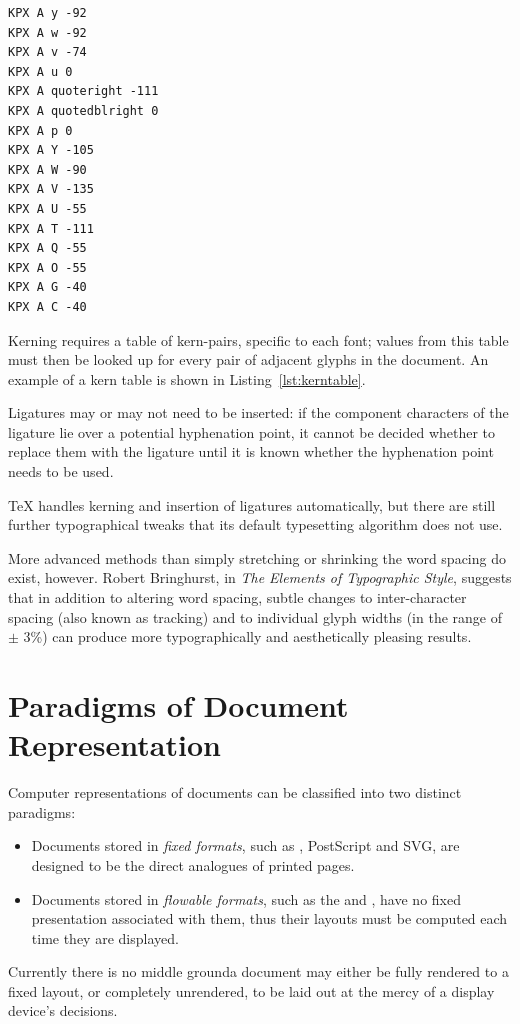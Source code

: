 \begin{lstlisting}[label=lst:kerntable,captionpos=b,float,basicstyle=\ttfamily\footnotesize,caption={[Excerpt from a kern table]An excerpt from a kern table for Times Roman, showing kern pairs beginning with \texttt{A} only. This is taken from an AFM (Adobe Font Metrics) file, where the units are (according to the specification\cite{ASI1998}) ``\emph{equal to 1/1000 of the scale factor (point size) of the font being used}''.}]
KPX A y -92
KPX A w -92
KPX A v -74
KPX A u 0
KPX A quoteright -111
KPX A quotedblright 0
KPX A p 0
KPX A Y -105
KPX A W -90
KPX A V -135
KPX A U -55
KPX A T -111
KPX A Q -55
KPX A O -55
KPX A G -40
KPX A C -40
\end{lstlisting}

Kerning requires a table of kern-pairs, specific to each font; values from this table must then be looked up for every pair of adjacent \glspl{glyph} in the document. An example of a kern table is shown in Listing~\ref{lst:kerntable}.

Ligatures may or may not need to be inserted: if the component characters of the ligature lie over a potential hyphenation point, it cannot be decided whether to replace them with the ligature until it is known whether the hyphenation point needs to be used.

\TeX{} handles \gls{kerning} and insertion of ligatures automatically, but there are still further typographical tweaks that its default typesetting algorithm does not use.

More advanced methods than simply stretching or shrinking the word spacing do exist, however. Robert Bringhurst, in \emph{The Elements of Typographic Style},\hspace{0pt}\cite{Bringhurst2008} suggests that in addition to altering word spacing, subtle changes to inter-character spacing (also known as \gls{tracking}) and to individual \gls{glyph} widths (in the range of $\pm$ 3\%) can produce more typographically and aesthetically pleasing results.




\section{Paradigms of Document Representation}
Computer representations of documents can be classified into two distinct paradigms:
\begin{itemize}
 \item Documents stored in \emph{fixed formats}, such as \pdf{}, PostScript and \textsc{SVG}, are designed to be the direct analogues of printed pages.
 \item Documents stored in \emph{flowable formats}, such as the \html{} and \epub{}, have no fixed presentation associated with them, thus their layouts must be computed each time they are displayed.
\end{itemize}
Currently there is no middle ground\ed a document may either be fully rendered to a fixed layout, or completely unrendered, to be laid out at the mercy of a display device's decisions.

